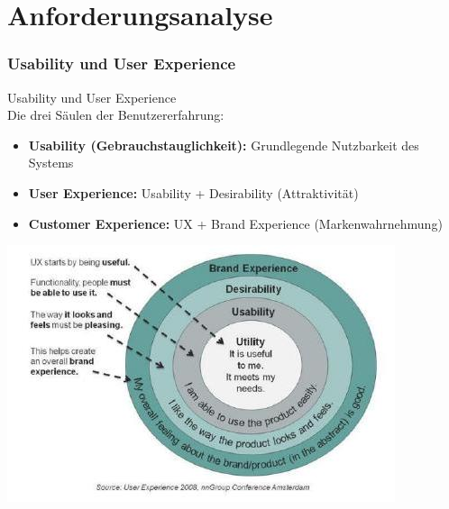 \section{Anforderungsanalyse}

\subsubsection{Usability und User Experience}

\begin{concept}{Usability und User Experience}\\
Die drei Säulen der Benutzererfahrung:
\begin{itemize}
    \item \textbf{Usability (Gebrauchstauglichkeit):} Grundlegende Nutzbarkeit des Systems
    \item \textbf{User Experience:} Usability + Desirability (Attraktivität)
    \item \textbf{Customer Experience:} UX + Brand Experience (Markenwahrnehmung)
\end{itemize}
\includegraphics[width=0.9\linewidth]{images/2024_12_29_0d1d7b5551ea1b4b41bdg-02}
\end{concept}

